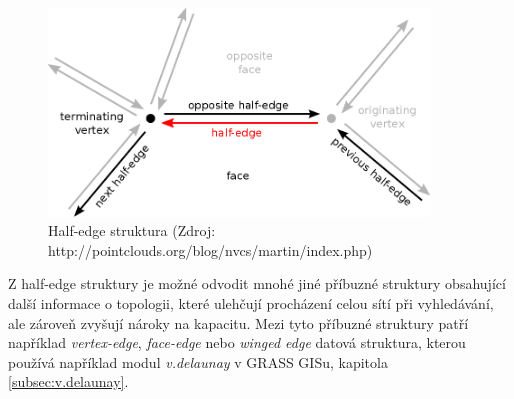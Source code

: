 \documentclass[12pt,a4paper]{article}
\begin{document}
\begin{figure}[h!]
\centering
\includegraphics[width=0.9\textwidth]{img/half_edge.png}
\caption{Half-edge struktura (Zdroj: http://pointclouds.org/blog/nvcs/martin/index.php)}
\label{fig:half_edge}
\end{figure}

Z half-edge struktury je možné odvodit mnohé jiné příbuzné struktury obsahující další informace o topologii, které ulehčují procházení celou sítí při vyhledávání, ale zároveň zvyšují nároky na kapacitu. Mezi tyto příbuzné struktury patří například \emph{vertex-edge}, \emph{face-edge} nebo \emph{winged edge} datová struktura, kterou používá například modul \emph{v.delaunay} v GRASS GISu, kapitola \ref{subsec:v.delaunay}.
\end{document}
